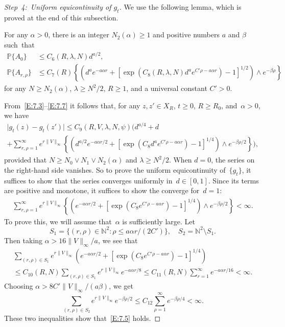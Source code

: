 \documentclass[AHL,Unicode,longabstracts]{cedram}
\newcommand{\N}{{\mathbb N}}
\newcommand{\pP}{{\mathbb P}}
\newcommand{\la}{\lambda}
\newcommand{\ty}{\infty}
\newenvironment{step}{\begin{proof}}{\let\qed\relax \end{proof}}
\begin{document}
\begin{step}[Step~4:~Uniform equicontinuity of $g_t$]
We use the following lemma, which is proved at the end of this subsection.

\begin{lemm}\label{L:4.3PR}
For any $\alpha>0$,
there is an integer $N_2(\alpha)\ge1$ and positive numbers $a$ and $\beta$ such~that
\begin{align}
\pP\{A_{0}\} &\le C_6(R,\la, N)d^{a/2},\label{E:7.7ffd}\\
\pP\{A_{r,\rho}\} &\le C_7(R) \!\left\{ \left(d^ae^{-a\alpha r} \!+\! \left[\exp \left(C_8(R,\la,N)d^a e^{ C'\rho-a\alpha r} \right) \!-\!1\right]^{1/2} \!\right) \!\wedge \! e^{-\beta\rho} \right\} \label{E:7.7}
\end{align}
for any $N\ge N_2(\alpha)$, $\la\ge N^2/2 $, $R\ge1$, and a universal constant $C'>0$.
\end{lemm}

From~\eqref{E:7.3}--\eqref{E:7.7} it follows that, for any $z,z'\in X_R$, $t\ge0$, $R\ge R_0$, and~$\alpha>0$, we have
\begin{multline*}
\bigl|g_t(z)-g_t(z')\bigr|\le C_{9}(R,V,\la,N, \psi) \Bigg(d^{a/4} + d \\
+ \sum_{r,\rho=1}^\infty \!\! e^{r\|V\|_\infty} \! \left\{ \! \left(d^{a/2}e^{-a\alpha r/2} + \left[\exp \left(C_8d^a e^{C'\rho-a\alpha r} \! \right) -1\right]^{1/4} \right) \wedge e^{-\beta\rho/2} \right\} \!\Bigg),
\end{multline*}
provided that $N \ge N_0\vee N_1\vee N_2(\alpha) $ and $\la\ge N^2/2 $. When $d=0$, the series on the right-hand side vanishes. So to prove the uniform equicontinuity of~$\{g_t\}$, it suffices to show that the series converges uniformly in~$d\in[0,1]$. Since its terms are positive and monotone, it suffices to show the converge for~$d=1$:
\begin{align}
\sum_{r,\rho=1}^\infty e^{r\|V\|_\infty} \left\{ \left(e^{-a\alpha r/2} + \left[\exp \left(C_8 e^{C'\rho-a\alpha r} \right) -1\right]^{1/4} \right) \wedge e^{-\beta\rho/2} \right\} < \infty. \label{E:7.5}
\end{align}
To prove this, we will assume that~$\alpha$ is sufficiently large. Let
\[
S_1=\{(r,\rho)\in\N^2: \rho\le a\alpha r/(2C') \}, \quad S_2=\N^2\setminus S_1.
\]
Then taking $\alpha> 16 \|V\|_\ty/a$, we see that
\begin{multline*}
\sum_{(r,\rho)\in S_1}e^{r\|V\|_\infty} \left(e^{-a\alpha r/2} + \left[\exp \left(C_8 e^{C'\rho-a\alpha r} \right) -1\right]^{1/4} \right) \\
\le C_{10}(R,N) \sum_{(r,\rho)\in S_1} e^{r\|V\|_\infty} e^{-a\alpha r/8}\le C_{11}(R,N) \sum_{r=1}^\ty e^{-a\alpha r/16}<\infty.
\end{multline*}
Choosing $\alpha> 8C'\|V\|_\ty/(a\beta) $, we get
\[
\sum_{(r,\rho)\in S_2} e^{r\|V\|_\ty}e^{-\beta\rho/2}\le C_{12} \sum_{\rho=1}^\infty e^{-\beta\rho/4}<\infty.
\]
These two inequalities show that~\eqref{E:7.5} holds.


\end{step}
\end{document}

